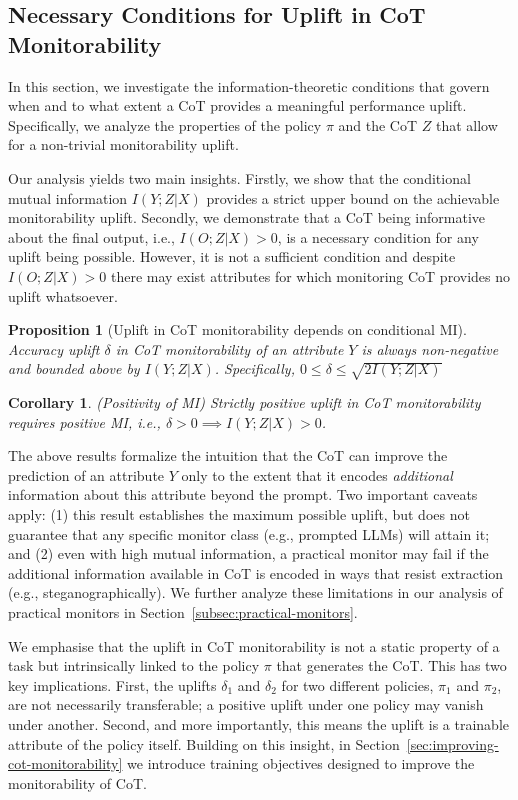 \documentclass{article}
\theoremstyle{plain}
\newtheorem{proposition}[theorem]{Proposition}
\newtheorem{corollary}[theorem]{Corollary}
\begin{document}
\subsection{Necessary Conditions for Uplift in CoT Monitorability}
\label{subsec:necessary-conditions}
In this section, we investigate the information-theoretic conditions that govern when and to what extent a CoT provides a meaningful performance uplift. Specifically, we analyze the properties of the policy $\pi$ and the CoT $Z$ that allow for a non-trivial monitorability uplift.

Our analysis yields two main insights.
Firstly, we show that the conditional mutual information $I(Y;Z|X)$ provides a strict upper bound on the achievable monitorability uplift.
Secondly, we demonstrate that a CoT being informative about the final output, i.e., $I(O;Z|X) > 0$, is a necessary condition for any uplift being possible.
However, it is not a sufficient condition and despite $I(O;Z|X) > 0$ there may exist attributes for which monitoring CoT provides no uplift whatsoever.

\begin{proposition}[Uplift in CoT monitorability depends on conditional MI]
\label{prop:uplift-bounded-by-mi}
Accuracy uplift $\delta$ in CoT monitorability of an attribute $Y$ is always non-negative and bounded above by $I(Y;Z|X)$. Specifically, 
\(
0 \leq \delta \leq \sqrt{2I(Y;Z|X)}    
\)
\end{proposition}

\begin{corollary}(Positivity of MI)
\label{corr:uplift-requires-positive-mi}
Strictly positive uplift in CoT monitorability requires positive MI, i.e., $\delta > 0 \implies I(Y;Z|X) > 0$.
\end{corollary}
The above results formalize the intuition that the CoT can improve the prediction of an attribute $Y$ only to the extent that it encodes \textit{additional} information about this attribute beyond the prompt.
Two important caveats apply:
(1) this result establishes the maximum possible uplift, but does not guarantee that any specific monitor class (e.g., prompted LLMs) will attain it; and 
(2) even with high mutual information, a practical monitor may fail if the additional information available in CoT is encoded in ways that resist extraction (e.g., steganographically). We further analyze these limitations in our analysis of practical monitors in Section~\ref{subsec:practical-monitors}.

We emphasise that the uplift in CoT monitorability is not a static property of a task but intrinsically linked to the policy $\pi$ that generates the CoT.
This has two key implications.
First, the uplifts $\delta_1$ and $\delta_2$ for two different policies, $\pi_1$ and $\pi_2$, are not necessarily transferable; a positive uplift under one policy may vanish under another.
Second, and more importantly, this means the uplift is a trainable attribute of the policy itself.
Building on this insight, in Section~\ref{sec:improving-cot-monitorability} we introduce training objectives designed to improve the monitorability of CoT.
\end{document}
